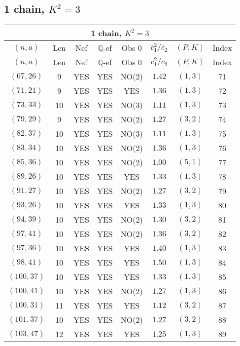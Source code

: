 \subsection{1 chain, $K^2 = 3$}
\begin{longtable}{|c|c|c|c|c|c|c|c|}
\hline
\multicolumn{8}{|c|}{1 chain, $K^2 = 3$}\\
\hline
$(n,a)$ & Len & Nef & $\mathbb Q$-ef & Obs 0 & $\overline c_1^2 / \overline c_2$ & $(P,K)$ & Index\\
\hline
\endfirsthead

\hline
$(n,a)$ & Len & Nef & $\mathbb Q$-ef & Obs 0 & $\overline c_1^2 / \overline c_2$ & $(P,K)$ & Index\\
\hline
\endhead
\hline
\endfoot

$(67,26)$ & 9 & YES & YES & NO(2) & $1.42$ & $(1,3)$ & 71\\
$(71,21)$ & 9 & YES & YES & YES & $1.36$ & $(1,3)$ & 72\\
$(73,33)$ & 10 & YES & YES & NO(3) & $1.11$ & $(1,3)$ & 73\\
$(79,29)$ & 9 & YES & YES & NO(2) & $1.27$ & $(3,2)$ & 74\\
$(82,37)$ & 10 & YES & YES & NO(3) & $1.11$ & $(1,3)$ & 75\\
$(83,34)$ & 10 & YES & YES & NO(2) & $1.36$ & $(1,3)$ & 76\\
$(85,36)$ & 10 & YES & YES & NO(2) & $1.00$ & $(5,1)$ & 77\\
$(89,26)$ & 10 & YES & YES & YES & $1.33$ & $(1,3)$ & 78\\
$(91,27)$ & 10 & YES & YES & NO(2) & $1.27$ & $(3,2)$ & 79\\
$(93,26)$ & 10 & YES & YES & YES & $1.33$ & $(1,3)$ & 80\\
$(94,39)$ & 10 & YES & YES & NO(2) & $1.30$ & $(3,2)$ & 81\\
$(97,41)$ & 10 & YES & YES & NO(2) & $1.36$ & $(3,2)$ & 82\\
$(97,36)$ & 10 & YES & YES & YES & $1.40$ & $(1,3)$ & 83\\
$(98,41)$ & 10 & YES & YES & YES & $1.50$ & $(1,3)$ & 84\\
$(100,37)$ & 10 & YES & YES & YES & $1.33$ & $(1,3)$ & 85\\
$(100,41)$ & 10 & YES & YES & NO(2) & $1.27$ & $(1,3)$ & 86\\
$(100,31)$ & 11 & YES & YES & YES & $1.12$ & $(3,2)$ & 87\\
$(101,37)$ & 10 & YES & YES & NO(2) & $1.27$ & $(3,2)$ & 88\\
$(103,47)$ & 12 & YES & YES & YES & $1.25$ & $(1,3)$ & 89\\

\end{longtable}
